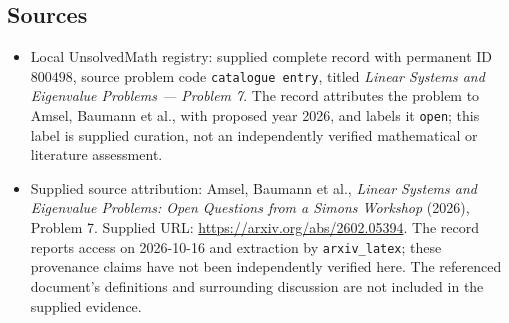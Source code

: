 \documentclass[11pt]{article}
\begin{document}
\subsection{Sources}
\begin{itemize}
\item Local UnsolvedMath registry: supplied complete record with permanent ID \(800498\), source problem code \texttt{catalogue entry}, titled \emph{Linear Systems and Eigenvalue Problems --- Problem 7}. The record attributes the problem to Amsel, Baumann et al., with proposed year 2026, and labels it \texttt{open}; this label is supplied curation, not an independently verified mathematical or literature assessment.
\item Supplied source attribution: Amsel, Baumann et al., \emph{Linear Systems and Eigenvalue Problems: Open Questions from a Simons Workshop} (2026), Problem 7. Supplied URL: \url{https://arxiv.org/abs/2602.05394}. The record reports access on 2026-10-16 and extraction by \texttt{arxiv\_latex}; these provenance claims have not been independently verified here. The referenced document's definitions and surrounding discussion are not included in the supplied evidence.
\end{itemize}
\end{document}

